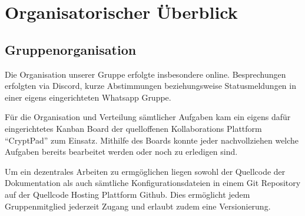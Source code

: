 \section{Organisatorischer Überblick}

\subsection{Gruppenorganisation}


Die Organisation unserer Gruppe erfolgte insbesondere online. Besprechungen erfolgten via Discord, kurze Abstimmungen beziehungsweise Statusmeldungen in einer eigens eingerichteten Whatsapp Gruppe.

Für die Organisation und Verteilung sämtlicher Aufgaben kam ein eigens dafür eingerichtetes Kanban Board der quelloffenen Kollaborations Plattform \enquote{CryptPad} zum Einsatz. Mithilfe des Boards konnte jeder nachvollziehen welche Aufgaben bereits bearbeitet werden oder noch zu erledigen sind.

Um ein dezentrales Arbeiten zu ermgöglichen liegen sowohl der Quellcode der Dokumentation als auch sämtliche Konfigurationsdateien in einem Git Repository auf der Quellcode Hosting Plattform Github. Dies ermöglicht jedem Gruppenmitglied jederzeit Zugang und erlaubt zudem eine Versionierung.